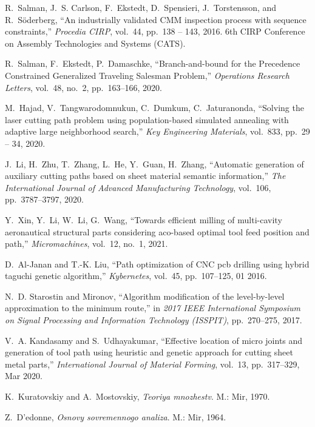 \begin{thebibliography}{10}
R.~Salman, J.~S. Carlson, F.~Ekstedt, D.~Spensieri, J.~Torstensson, and
  R.~S\"{o}derberg, ``An industrially validated {CMM} inspection process with
  sequence constraints,'' {\em Procedia CIRP}, vol.~44, pp.~138 -- 143, 2016.
\newblock 6th CIRP Conference on Assembly Technologies and Systems (CATS).

R.~Salman, F.~Ekstedt, P.~Damaschke, ``Branch-and-bound for the
  {P}recedence {C}onstrained {G}eneralized {T}raveling {S}alesman {P}roblem,''
  {\em Operations Research Letters}, vol.~48, no.~2, pp.~163--166, 2020.

M.~Hajad, V.~Tangwarodomnukun, C.~Dumkum, C.~Jaturanonda, ``Solving the
  laser cutting path problem using population-based simulated annealing with
  adaptive large neighborhood search,'' {\em Key Engineering Materials},
  vol.~833, pp.~29 -- 34, 2020.

J.~Li, H.~Zhu, T.~Zhang, L.~He, Y.~Guan, H.~Zhang, ``Automatic generation
  of auxiliary cutting paths based on sheet material semantic information,''
  {\em The International Journal of Advanced Manufacturing Technology},
  vol.~106, pp.~3787--3797, 2020.

Y.~Xin, Y.~Li, W.~Li, G.~Wang, ``Towards efficient milling of multi-cavity
  aeronautical structural parts considering aco-based optimal tool feed
  position and path,'' {\em Micromachines}, vol.~12, no.~1, 2021.

D.~Al-Janan and T.-K. Liu, ``Path optimization of {CNC} pcb drilling using
  hybrid taguchi genetic algorithm,'' {\em Kybernetes}, vol.~45, pp.~107--125,
  01 2016.

N.~D. Starostin and Mironov, ``Algorithm modification of the level-by-level
  approximation to the minimum route,'' in {\em 2017 IEEE International
  Symposium on Signal Processing and Information Technology (ISSPIT)},
  pp.~270--275, 2017.

V.~A. Kandasamy and S.~Udhayakumar, ``{Effective location of micro joints and
  generation of tool path using heuristic and genetic approach for cutting
  sheet metal parts},'' {\em International Journal of Material Forming},
  vol.~13, pp.~317--329, Mar 2020.

K.~Kuratovskiy and A.~Mostovskiy, {\em Teoriya mnozhestv}.
\newblock M.: Mir, 1970.

Z.~D'edonne, {\em Osnovy sovremennogo analiza}.
\newblock M.: Mir, 1964.


\end{thebibliography}
